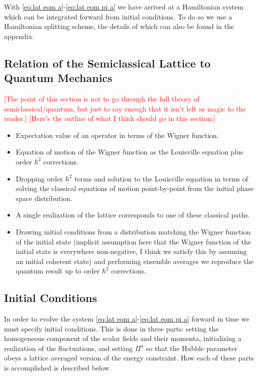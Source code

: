 With \eqref{eq:lat eom a}-\eqref{eq:lat eom pi a} we have arrived at a Hamiltonian system which can be integrated forward from initial conditions. To do so we use a Hamiltonian splitting scheme, the details of which can also be found in the appendix.

\subsection{Relation of the Semiclassical Lattice to Quantum Mechanics}
\textcolor{red}{[The point of this section is not to go through the full theory of semiclassical/quantum, but just to say enough that it isn't left as magic to the reader.]}
\textcolor{red}{[Here's the outline of what I think should go in this section:]}
\begin{itemize}
  \color{red}
  \item Expectation value of an operator in terms of the Wigner function.
  \item Equation of motion of the Wigner function as the Louisville equation plus order $\hbar^2$ corrections.
  \item Dropping order $\hbar^2$ terms and solution to the Louisville equation in terms of solving the classical equations of motion point-by-point from the initial phase space distribution.
  \item A single realization of the lattice corresponds to one of these classical paths.
  \item Drawing initial conditions from a distribution matching the Wigner function of the initial state (implicit assumption here that the Wigner function of the initial state is everywhere non-negative, I think we satisfy this by assuming an initial coherent state) and performing ensemble averages we reproduce the quantum result up to order $\hbar^2$ corrections.
\end{itemize}
  
\subsection{Initial Conditions} \label{sec:ICs}
In order to evolve the system \eqref{eq:lat eom a}-\eqref{eq:lat eom pi a} forward in time we must specify initial conditions. This is done in three parts: setting the homogeneous component of the scalar fields and their momenta, initializing a realization of the fluctuations, and setting $\Pi^a$ so that the Hubble parameter obeys a lattice averaged version of the energy constraint. How each of these parts is accomplished is described below.

